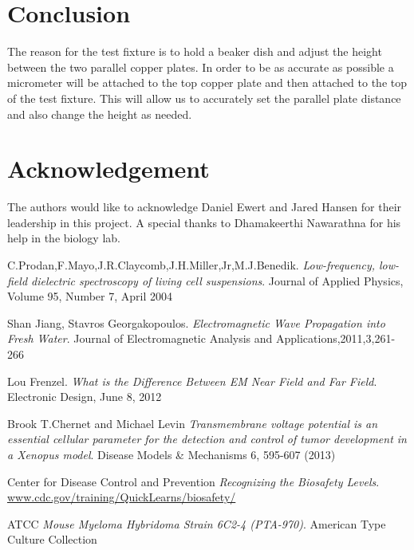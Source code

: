 \documentclass[journal]{IEEEtran}
\begin{document}
\section{Conclusion}
The reason for the test fixture is to hold a beaker dish and
  adjust the height between the two parallel copper plates. In order to be as accurate as possible a micrometer will be attached to the top copper plate and then attached to the top of the test fixture. This will allow us to accurately set the parallel plate distance and also change the height as needed. 

\section{Acknowledgement}
The authors would like to acknowledge Daniel Ewert and Jared Hansen for their leadership in this project. A special thanks to Dhamakeerthi Nawarathna for his help in the biology lab.

\begin{thebibliography}{9}

C.Prodan,F.Mayo,J.R.Claycomb,J.H.Miller,Jr,M.J.Benedik.
\textit{Low-frequency, low-field dielectric spectroscopy of living cell suspensions}.
Journal of Applied Physics, Volume 95, Number 7, April 2004

Shan Jiang, Stavros Georgakopoulos.
\textit{Electromagnetic Wave Propagation into Fresh Water}.
Journal of Electromagnetic Analysis and Applications,2011,3,261-266

Lou Frenzel.
\textit{What is the Difference Between EM Near Field and Far Field}.
Electronic Design, June 8, 2012

Brook T.Chernet and Michael Levin
\textit{Transmembrane voltage potential is an essential cellular parameter for the detection and control of tumor development in a Xenopus model}. Disease Models & Mechanisms 6, 595-607 (2013)

Center for Disease Control and Prevention
\textit{Recognizing the Biosafety Levels}.
\url{www.cdc.gov/training/QuickLearns/biosafety/}

ATCC
\textit{Mouse Myeloma Hybridoma Strain 6C2-4 (PTA-970)}.
American Type Culture Collection

\end{thebibliography}
\end{document}
